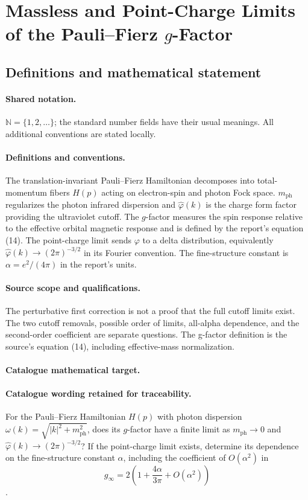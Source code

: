 \documentclass[11pt]{article}
\begin{document}
\section{Massless and Point-Charge Limits of the Pauli–Fierz $g$-Factor}\label{statement}

\subsection{Definitions and mathematical statement}

\paragraph{Shared notation.}$\mathbb N=\{1,2,\ldots\}$; the standard number fields have their usual meanings. All additional conventions are stated locally.


\paragraph{Definitions and conventions.} The translation-invariant Pauli--Fierz Hamiltonian decomposes into total-momentum fibers $H(p)$ acting on electron-spin and photon Fock space. $m_{\mathrm{ph}}$ regularizes the photon infrared dispersion and $\widehat\varphi(k)$ is the charge form factor providing the ultraviolet cutoff. The $g$-factor measures the spin response relative to the effective orbital magnetic response and is defined by the report's equation (14). The point-charge limit sends $\varphi$ to a delta distribution, equivalently $\widehat\varphi(k)\to(2\pi)^{-3/2}$ in its Fourier convention. The fine-structure constant is $\alpha=e^2/(4\pi)$ in the report's units.

\paragraph{Source scope and qualifications.} The perturbative first correction is not a proof that the full cutoff limits exist. The two cutoff removals, possible order of limits, all-alpha dependence, and the second-order coefficient are separate questions. The g-factor definition is the source's equation (14), including effective-mass normalization.

\paragraph{Catalogue mathematical target.}
\paragraph{Catalogue wording retained for traceability.}
For the Pauli–Fierz Hamiltonian $H(p)$ with photon dispersion $\omega(k)=\sqrt{|k|^2+m_{\mathrm{ph}}^2}$, does its $g$-factor have a finite limit as $m_{\mathrm{ph}}\to0$ and $\widehat\varphi(k)\to(2\pi)^{-3/2}$? If the point-charge limit exists, determine its dependence on the fine-structure constant $\alpha$, including the coefficient of $O(\alpha^2)$ in $$g_\infty=2\left(1+\frac{4\alpha}{3\pi}+O(\alpha^2)\right)$$.
\end{document}

